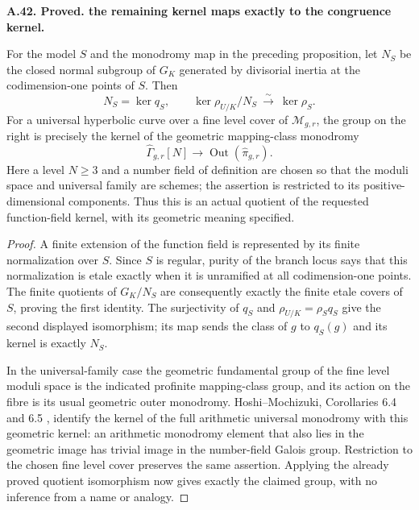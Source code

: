 \documentclass[11pt,oneside]{article}
\makeatletter
\newcounter{statementanchor}
\newenvironment{statement}[3]{%
 \refstepcounter{statementanchor}\def\@currentlabel{#1}%
 \par\addvspace{9pt}\noindent
 \textbf{#1. #2. #3.}\par\nobreak\noindent\ignorespaces
}{\par\addvspace{5pt}}
\makeatother
\begin{document}
\begin{statement}{A.42}{Proved}{the remaining kernel maps exactly to the congruence kernel}
\label{st:A.42}
\label{A:family-kernel-quotient}
For the model $S$ and the monodromy map in the preceding
proposition, let $N_S$ be the closed normal subgroup of
$G_K$ generated by divisorial inertia at the codimension-one
points of $S$. Then
\[
 N_S=\ker q_S,\qquad
 \ker\rho_{U/K}/N_S\ \xrightarrow{\sim}\ \ker\rho_S.
\]
For a universal hyperbolic curve over a fine level cover of
$\mathcal M_{g,r}$, the group on the right is precisely the
kernel of the geometric mapping-class monodromy
\[
 \widehat\Gamma_{g,r}[N]\longrightarrow
                         \operatorname{Out}(\widehat\pi_{g,r}).
\]
Here a level $N\ge3$ and a number field of definition are
chosen so that the moduli space and universal family are
schemes; the assertion is restricted to its positive-dimensional
components. Thus this is an actual quotient of the requested
function-field kernel, with its geometric meaning specified.
\end{statement}
\begin{proof}
A finite extension of the function field is represented by
its finite normalization over $S$. Since $S$ is regular,
purity of the branch locus says that this normalization is
etale exactly when it is unramified at all codimension-one
points. The finite quotients of $G_K/N_S$ are consequently
exactly the finite etale covers of $S$, proving the first
identity. The surjectivity of $q_S$ and
$\rho_{U/K}=\rho_Sq_S$ give the second displayed isomorphism;
its map sends the class of $g$ to $q_S(g)$ and its kernel is
exactly $N_S$.

In the universal-family case the geometric fundamental group
of the fine level moduli space is the indicated profinite
mapping-class group, and its action on the fibre is its
usual geometric outer monodromy. Hoshi--Mochizuki,
Corollaries 6.4 and 6.5 \cite{A_HoshiMochizuki2011}, identify
the kernel of the full arithmetic universal monodromy with
this geometric kernel: an arithmetic monodromy element that
also lies in the geometric image has trivial image in the
number-field Galois group. Restriction to the chosen fine
level cover preserves the same assertion. Applying the
already proved quotient isomorphism now gives exactly the
claimed group, with no inference from a name or analogy.
\end{proof}
\end{document}
